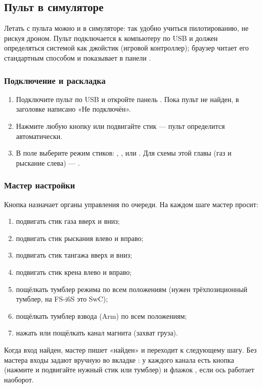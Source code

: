 \subsection{Пульт в симуляторе}

Летать с пульта можно и в симуляторе: так удобно учиться пилотированию, не рискуя дроном. Пульт подключается к компьютеру по USB и должен определяться системой как джойстик (игровой контроллер); браузер читает его стандартным способом и показывает в панели .

\subsubsection{Подключение и раскладка}
\begin{enumerate}
    \item Подключите пульт по USB и откройте панель . Пока пульт не найден, в заголовке написано «Не подключён».
    \item Нажмите любую кнопку или подвигайте стик --- пульт определится автоматически.
    \item В поле  выберите режим стиков: , ,  или . Для схемы этой главы (газ и рыскание слева) --- .
\end{enumerate}

\subsubsection{Мастер настройки}
Кнопка  назначает органы управления по очереди. На каждом шаге мастер просит:
\begin{enumerate}
    \item подвигать стик газа вверх и вниз;
    \item подвигать стик рыскания влево и вправо;
    \item подвигать стик тангажа вверх и вниз;
    \item подвигать стик крена влево и вправо;
    \item пощёлкать тумблер режима по всем положениям (нужен трёхпозиционный тумблер, на FS-i6S это SwC);
    \item пощёлкать тумблер взвода (Arm) по всем положениям;
    \item нажать или пощёлкать канал магнита (захват груза).
\end{enumerate}
Когда вход найден, мастер пишет «найден» и переходит к следующему шагу. Без мастера входы задают вручную во вкладке : у каждого канала есть кнопка  (нажмите и подвигайте нужный стик или тумблер) и флажок , если ось работает наоборот.

